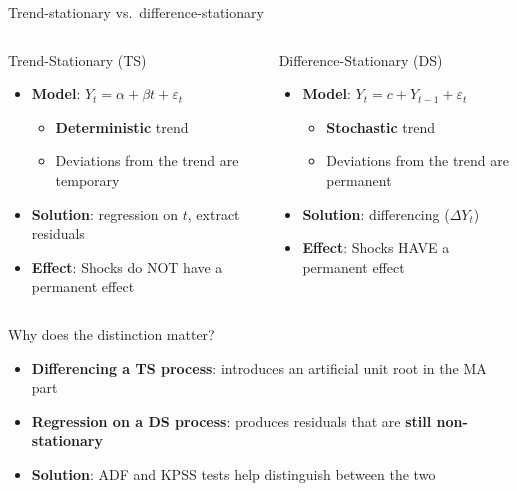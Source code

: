 \documentclass[9pt, aspectratio=169, t]{beamer}
\begin{document}
\begin{frame}{Trend-stationary vs.\ difference-stationary}
    \vspace{-0.2cm}
    {\footnotesize
    \begin{columns}[T]
        \begin{block}{Trend-Stationary (TS)}
            \begin{itemize}\setlength{\itemsep}{1pt}
                \item \textbf{Model}: $Y_t = \alpha + \beta t + \varepsilon_t$
                \begin{itemize}
                    \item \textbf{Deterministic} trend
                    \item Deviations from the trend are temporary
                \end{itemize}
                \item \textbf{Solution}: regression on $t$, extract residuals
                \item \textbf{Effect}: Shocks do NOT have a permanent effect
            \end{itemize}
        \end{block}

        \begin{alertblock}{Difference-Stationary (DS)}
            \begin{itemize}\setlength{\itemsep}{1pt}
                \item \textbf{Model}: $Y_t = c + Y_{t-1} + \varepsilon_t$
                \begin{itemize}
                    \item \textbf{Stochastic} trend
                    \item Deviations from the trend are permanent
                \end{itemize}
                \item \textbf{Solution}: differencing ($\Delta Y_t$)
                \item \textbf{Effect}: Shocks HAVE a permanent effect
            \end{itemize}
        \end{alertblock}
    \end{columns}

    \begin{exampleblock}{Why does the distinction matter?}
        \begin{itemize}\setlength{\itemsep}{0pt}
            \item \textbf{Differencing a TS process}: introduces an artificial unit root in the MA part
            \item \textbf{Regression on a DS process}: produces residuals that are \textbf{still non-stationary}
            \item \textbf{Solution}: ADF and KPSS tests help distinguish between the two
        \end{itemize}
    \end{exampleblock}
    }
\end{frame}
\end{document}
